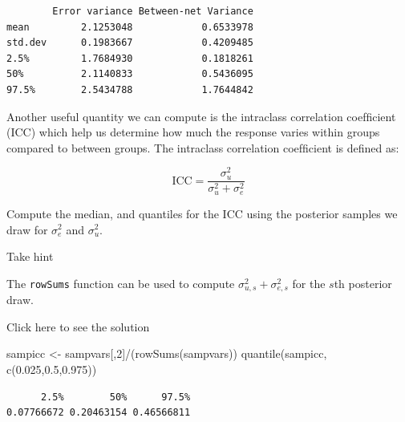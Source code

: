 \documentclass[
  letterpaper,
  DIV=11,
  numbers=noendperiod]{scrartcl}
\newenvironment{Shaded}{\begin{snugshade}}{\end{snugshade}}
\newcommand{\DecValTok}[1]{\textcolor[rgb]{0.68,0.00,0.00}{#1}}
\newcommand{\FloatTok}[1]{\textcolor[rgb]{0.68,0.00,0.00}{#1}}
\newcommand{\FunctionTok}[1]{\textcolor[rgb]{0.28,0.35,0.67}{#1}}
\newcommand{\NormalTok}[1]{\textcolor[rgb]{0.00,0.23,0.31}{#1}}
\newcommand{\OtherTok}[1]{\textcolor[rgb]{0.00,0.23,0.31}{#1}}
\newcommand{\SpecialCharTok}[1]{\textcolor[rgb]{0.37,0.37,0.37}{#1}}
\begin{document}
\begin{verbatim}
        Error variance Between-net Variance
mean         2.1253048            0.6533978
std.dev      0.1983667            0.4209485
2.5%         1.7684930            0.1818261
50%          2.1140833            0.5436095
97.5%        2.5434788            1.7644842
\end{verbatim}

\begin{tcolorbox}[enhanced jigsaw, titlerule=0mm, breakable, opacitybacktitle=0.6, rightrule=.15mm, left=2mm, arc=.35mm, toptitle=1mm, coltitle=black, colframe=quarto-callout-warning-color-frame, opacityback=0, colback=white, bottomrule=.15mm, leftrule=.75mm, colbacktitle=quarto-callout-warning-color!10!white, bottomtitle=1mm, title={Task}, toprule=.15mm]

Another useful quantity we can compute is the intraclass correlation
coefﬁcient (ICC) which help us determine how much the response varies
within groups compared to between groups. The intraclass correlation
coefﬁcient is defined as:

\[
\text{ICC} = \frac{\sigma^2_u}{\sigma^2_u + \sigma^2_e}
\]

Compute the median, and quantiles for the ICC using the posterior
samples we draw for \(\sigma^2_e\) and \(\sigma^2_u\).

Take hint

The \texttt{rowSums} function can be used to compute
\(\sigma^2_{u,s} + \sigma^2_{e,s}\) for the \(s\)th posterior draw.

Click here to see the solution

\begin{Shaded}
\begin{Highlighting}[]
\NormalTok{sampicc }\OtherTok{\textless{}{-}}\NormalTok{ sampvars[,}\DecValTok{2}\NormalTok{]}\SpecialCharTok{/}\NormalTok{(}\FunctionTok{rowSums}\NormalTok{(sampvars))}
\FunctionTok{quantile}\NormalTok{(sampicc, }\FunctionTok{c}\NormalTok{(}\FloatTok{0.025}\NormalTok{,}\FloatTok{0.5}\NormalTok{,}\FloatTok{0.975}\NormalTok{))}
\end{Highlighting}
\end{Shaded}

\begin{verbatim}
      2.5%        50%      97.5% 
0.07766672 0.20463154 0.46566811 
\end{verbatim}

\end{tcolorbox}
\end{document}
